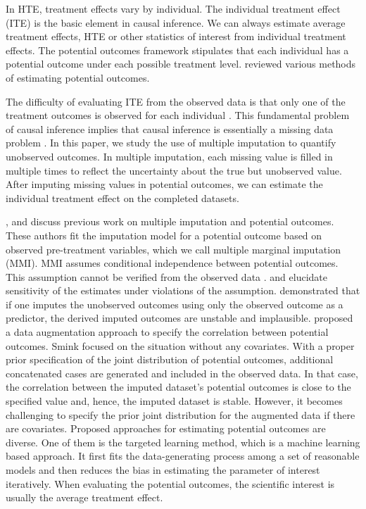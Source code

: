 	In HTE, treatment effects vary by individual. The individual treatment effect (ITE) is the basic element in causal inference. We can always estimate average treatment effects, HTE or other statistics of interest from individual treatment effects. The potential outcomes framework stipulates that each individual has a potential outcome under each possible treatment level. \citet{ding2018causal} reviewed various methods of estimating potential outcomes. 
	
	The difficulty of evaluating ITE from the observed data is that only one of the treatment outcomes is observed for each individual \citep{rubin1974estimating, hernan2010causal}. This fundamental problem of causal inference implies that causal inference is essentially a missing data problem \citep{rubin2005causal, ding2018causal}. In this paper, we study the use of multiple imputation to quantify unobserved outcomes. In multiple imputation, each missing value is filled in multiple times to reflect the uncertainty about the true but unobserved value. After imputing missing values in potential outcomes, we can estimate the individual treatment effect on the completed datasets. 
	
	\citet{lamont2018identification}, and \citet{westreich2015imputation} discuss previous work on multiple imputation and potential outcomes. These authors fit the imputation model for a potential outcome based on observed pre-treatment variables, which we call multiple marginal imputation (MMI). MMI assumes conditional independence between potential outcomes. This assumption cannot be verified from the observed data \citep{rassler2012statistical}. \citet{imbens2015causal} and \citet{gadbury2001evaluating} elucidate sensitivity of the estimates under violations of the assumption. \citet{Buuren2018} demonstrated that if one imputes the unobserved outcomes using only the observed outcome as a predictor, the derived imputed outcomes are unstable and implausible. \citet{smink2016towards} proposed a data augmentation approach to specify the correlation between potential outcomes. Smink focused on the situation without any covariates. With a proper prior specification of the joint distribution of potential outcomes, additional concatenated cases are generated and included in the observed data. In that case, the correlation between the imputed dataset's potential outcomes is close to the specified value and, hence, the imputed dataset is stable. However, it becomes challenging to specify the prior joint distribution for the augmented data if there are covariates. Proposed approaches for estimating potential outcomes are diverse. One of them is the targeted learning method, which is a machine learning based approach. It first fits the data-generating process among a set of reasonable models and then reduces the bias in estimating the parameter of interest iteratively. When evaluating the potential outcomes, the scientific interest is usually the average treatment effect.   
	
